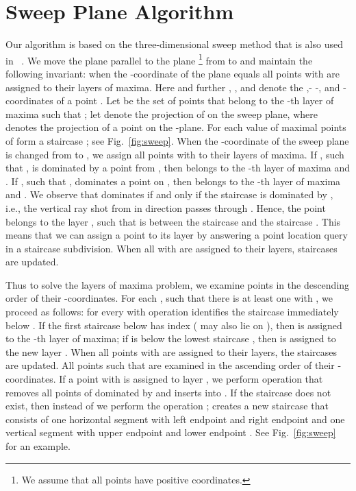 \documentclass[10pt]{llncs}
\begin{document}
\section{Sweep Plane Algorithm}
\label{sec:over}
Our algorithm is based on the three-dimensional sweep method that is also 
used in ~\cite{BG04}. We move the plane parallel to the  plane
\footnote{We assume that all points have positive coordinates.} from 
 to
  and
 maintain the following invariant: when the -coordinate of the plane 
equals  all points  with  are assigned to their layers of
maxima. 
Here and further , , and  denote the ,- -, and
 -coordinates of a point .
Let  be the set of points  that belong to the -th layer of
maxima 
such that ; let  denote the projection of  on the 
sweep plane,  where  denotes the 
projection of a point  on the -plane. For each value of  maximal 
points of    form a staircase ; see Fig.~\ref{fig:sweep}. 
When the -coordinate of the sweep plane is changed from   to , 
we assign all points with   to their layers of maxima. 
If , such that ,  
is dominated by a point from , then  belongs to the -th 
layer of maxima and . If , such that , dominates a point 
on , then  belongs to the -th layer of maxima and .
We observe that  dominates  if and only if 
the staircase  is dominated by  , 
i.e., the vertical ray shot from  in  direction passes through .  
Hence, the point  belongs to the layer , such that 
 is between the staircase  and the staircase .
This means that we can assign a point to its layer by answering a point 
location query in a staircase subdivision. 
When all  with  are assigned to their layers, staircases
 are updated.

Thus to solve the layers of maxima problem, we examine points in the 
descending order of their -coordinates.
For each , such that there is at least one  with , we proceed 
as follows: for every  with   operation  identifies the 
staircase  
immediately below . If the first staircase below  has index 
 ( may also lie on ), then 
 is assigned to the -th layer of maxima; if  
is below the lowest staircase , then  is assigned to the  
new layer . 
When all points with  are assigned to their layers, the staircases 
are updated. All points  such that  are examined 
in the ascending order of their -coordinates. 
If a point  with  is assigned to layer , 
we perform operation  that removes all 
points of  dominated by  and inserts  into .
If the staircase  does not exist, then instead of  
we perform the operation ;  
creates a new staircase  that consists of one horizontal segment  
with left endpoint  and right endpoint  and one vertical
segment  with upper endpoint  and lower endpoint .
See Fig.~\ref{fig:sweep} for an example. 
\end{document}
